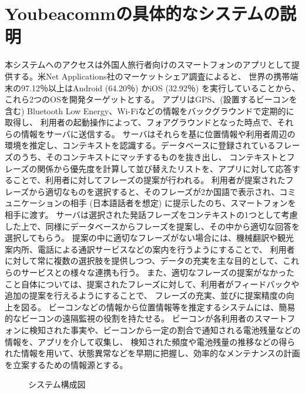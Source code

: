 \documentclass[11pt,papersize]{jsbook}
\begin{document}
\section{Youbeacommの具体的なシステムの説明}
 本システムへのアクセスは外国人旅行者向けのスマートフォンのアプリとして提供する。米Net Applications社のマーケットシェア調査\cite{b}によると、
世界の携帯端末の97.12％以上はAndroid (64.20％) かiOS (32.92％) を実行していることから、これら2つのOSを開発ターゲットとする。
アプリはGPS、(設置するビーコンを含む) Bluetooth Low Energy、Wi-Fiなどの情報をバックグラウンドで定期的に取得し、
利用者の起動操作によって、フォアグラウンドとなった時点で、それらの情報をサーバに送信する。
サーバはそれらを基に位置情報や利用者周辺の環境を推定し、コンテキストを認識する。データベースに登録されているフレーズのうち、そのコンテキストにマッチするものを抜き出し、
コンテキストとフレーズの関係から優先度を計算して並び替えたリストを、アプリに対して応答することで、利用者に対してフレーズの提案が行われる。
利用者が提案されたフレーズから適切なものを選択すると、そのフレーズが2か国語で表示され、コミュニケーションの相手 (日本語話者を想定) に提示したのち、スマートフォンを相手に渡す。
サーバは選択された発話フレーズをコンテキストの1つとして考慮した上で、同様にデータベースからフレーズを提案し、その中から適切な回答を選択してもらう。
提案の中に適切なフレーズがない場合には、機械翻訳や観光案内所、電話による通訳サービスなどの案内を行うようにすることで、
利用者に対して常に複数の選択肢を提供しつつ、データの充実を主な目的として、これらのサービスとの様々な連携も行う。
また、適切なフレーズの提案がなかったこと自体については、提案されたフレーズに対して、利用者がフィードバックや追加の提案を行えるようにすることで、
フレーズの充実、並びに提案精度の向上を図る。
ビーコンなどの情報から位置情報等を推定するシステムには、簡易的なビーコンの遠隔監視の役割を持たせる。
ビーコンが各利用者のスマートフォンに検知された事実や、ビーコンから一定の割合で通知される電池残量などの情報を、アプリを介して収集し、
検知された頻度や電池残量の推移などの得られた情報を用いて、状態異常などを早期に把握し、効率的なメンテナンスの計画を立案するための情報源とする。
\begin{figure}[htbp]
 \begin{center}
 \end{center}
 \caption{システム構成図}
 \label{fig:one}
\end{figure}
\end{document}

